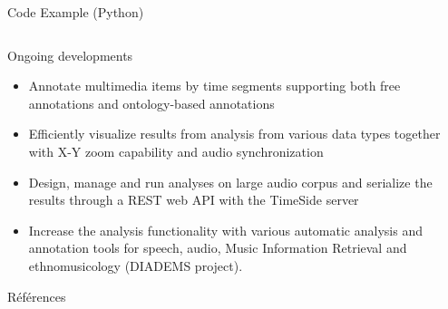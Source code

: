 \documentclass[final, hyperref, table]{beamer}
\begin{document}
\begin{frame}[containsverbatim]{}
\begin{columns}[T]
\begin{column}[T]{.49\linewidth}
\begin{block}{Code Example (Python)}
\begin{columns}[T]
  \begin{column}[T]{0.35\linewidth}
  \end{column}
\end{columns}
  \end{block}

  \begin{block}{Ongoing developments}
\vspace{-1cm}
    \begin{multicols}{2}[]
        \begin{itemize}
        \item \alert{Annotate} multimedia items by time segments supporting both free annotations and ontology-based annotations
        \item Efficiently \alert{visualize} results from analysis from various data types together with X-Y zoom capability and audio synchronization
        \item Design, manage and run analyses on large audio corpus and serialize the results through a REST web API with the TimeSide server
        \item Increase the analysis functionality with various automatic analysis and annotation tools for speech, audio, Music Information Retrieval and ethnomusicology (DIADEMS project).

\end{itemize}
\end{multicols}
\end{block}

\begin{block}{Références}\tiny

\vspace{-1cm}
\begin{multicols}{2}[]

\end{multicols}
\end{block}
  
\end{column}
\end{columns}
\end{frame}
\end{document}
